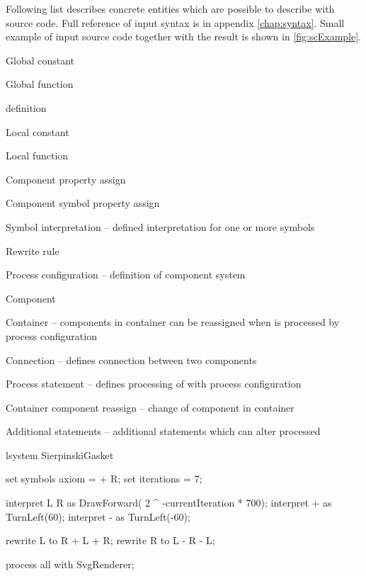 Following list describes concrete entities which are possible to describe with source code.
Full reference of input syntax is in appendix \ref{chap:syntax}.
Small example of input source code together with the result is shown in \autoref{fig:scExample}.

\begin{itemize*}
	\item Global constant
	\item Global function
	\item \lsystem definition
		\begin{itemize*}
			\item Local constant
			\item Local function
			\item Component property assign
			\item Component symbol property assign
			\item Symbol interpretation -- defined interpretation for one or more \lsystem symbols
			\item Rewrite rule
		\end{itemize*}
	\item Process configuration -- definition of component system
		\begin{itemize*}
			\item Component
			\item Container -- components in container can be reassigned when \lsystem is processed by process configuration
			\item Connection -- defines connection between two components
		\end{itemize*}
	\item Process statement -- defines processing of \lsystem with process configuration
		\begin{itemize*}
			\item Container component reassign -- change of component in container
			\item Additional \lsystem statements -- additional \lsystem statements which can alter processed \lsystem
		\end{itemize*}
\end{itemize*}

\newsavebox{\lstBoxParams}
\begin{lrbox}{\lstBoxParams}
\begin{Lsystem50}
lsystem SierpinskiGasket {
	set symbols axiom = + R;
	set iterations = 7;

	interpret L R as DrawForward(
		2 ^ -currentIteration
		* 700);
	interpret + as TurnLeft(60);
	interpret - as TurnLeft(-60);

	rewrite L to R + L + R;
	rewrite R to L - R - L;
}
process all with SvgRenderer;
\end{Lsystem50}
\end{lrbox}

